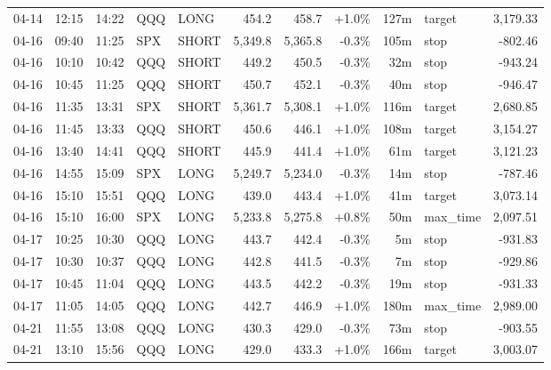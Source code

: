 \documentclass[11pt,a4paper,twoside]{article}
\begin{document}
\begin{center}
\begin{longtable}{>{\color{txtmain}}l l l l l r r r r >{\color{txtmain}}l r}
04-14 & 12:15 & 14:22 & QQQ & LONG & 454.2 & 458.7 & \textcolor{wingreen}{+1.0\%} & 127m & target & \textcolor{wingreen}{3,179.33} \\
04-16 & 09:40 & 11:25 & SPX & SHORT & 5,349.8 & 5,365.8 & \textcolor{lossred}{-0.3\%} & 105m & stop & \textcolor{lossred}{-802.46} \\
04-16 & 10:10 & 10:42 & QQQ & SHORT & 449.2 & 450.5 & \textcolor{lossred}{-0.3\%} & 32m & stop & \textcolor{lossred}{-943.24} \\
04-16 & 10:45 & 11:25 & QQQ & SHORT & 450.7 & 452.1 & \textcolor{lossred}{-0.3\%} & 40m & stop & \textcolor{lossred}{-946.47} \\
04-16 & 11:35 & 13:31 & SPX & SHORT & 5,361.7 & 5,308.1 & \textcolor{wingreen}{+1.0\%} & 116m & target & \textcolor{wingreen}{2,680.85} \\
04-16 & 11:45 & 13:33 & QQQ & SHORT & 450.6 & 446.1 & \textcolor{wingreen}{+1.0\%} & 108m & target & \textcolor{wingreen}{3,154.27} \\
04-16 & 13:40 & 14:41 & QQQ & SHORT & 445.9 & 441.4 & \textcolor{wingreen}{+1.0\%} & 61m & target & \textcolor{wingreen}{3,121.23} \\
04-16 & 14:55 & 15:09 & SPX & LONG & 5,249.7 & 5,234.0 & \textcolor{lossred}{-0.3\%} & 14m & stop & \textcolor{lossred}{-787.46} \\
04-16 & 15:10 & 15:51 & QQQ & LONG & 439.0 & 443.4 & \textcolor{wingreen}{+1.0\%} & 41m & target & \textcolor{wingreen}{3,073.14} \\
04-16 & 15:10 & 16:00 & SPX & LONG & 5,233.8 & 5,275.8 & \textcolor{wingreen}{+0.8\%} & 50m & max\_time & \textcolor{wingreen}{2,097.51} \\
04-17 & 10:25 & 10:30 & QQQ & LONG & 443.7 & 442.4 & \textcolor{lossred}{-0.3\%} & 5m & stop & \textcolor{lossred}{-931.83} \\
04-17 & 10:30 & 10:37 & QQQ & LONG & 442.8 & 441.5 & \textcolor{lossred}{-0.3\%} & 7m & stop & \textcolor{lossred}{-929.86} \\
04-17 & 10:45 & 11:04 & QQQ & LONG & 443.5 & 442.2 & \textcolor{lossred}{-0.3\%} & 19m & stop & \textcolor{lossred}{-931.33} \\
04-17 & 11:05 & 14:05 & QQQ & LONG & 442.7 & 446.9 & \textcolor{wingreen}{+1.0\%} & 180m & max\_time & \textcolor{wingreen}{2,989.00} \\
04-21 & 11:55 & 13:08 & QQQ & LONG & 430.3 & 429.0 & \textcolor{lossred}{-0.3\%} & 73m & stop & \textcolor{lossred}{-903.55} \\
04-21 & 13:10 & 15:56 & QQQ & LONG & 429.0 & 433.3 & \textcolor{wingreen}{+1.0\%} & 166m & target & \textcolor{wingreen}{3,003.07} \\

\end{longtable}
\end{center}
\end{document}
